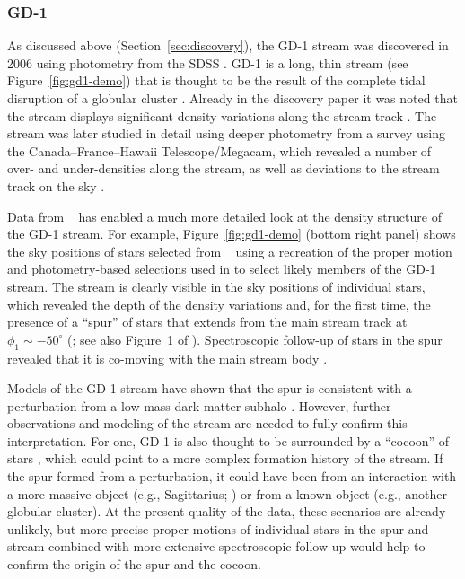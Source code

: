 \documentclass[final,5p,times,twocolumn,authoryear]{elsarticle}
\begin{document}
\subsubsection{GD-1}
\label{sec:gd1}

As discussed above (Section~\ref{sec:discovery}), the GD-1 stream was discovered in 2006
using photometry from the SDSS \citep{grillmair:2006-gd1}.
GD-1 is a long, thin stream (see Figure~\ref{fig:gd1-demo}) that is thought to be the
result of the complete tidal disruption of a globular cluster \citep{koposov:2010}.
Already in the discovery paper it was noted that the stream displays significant density
variations along the stream track \citep{grillmair:2006-gd1}.
The stream was later studied in detail using deeper photometry from a survey using the
Canada--France--Hawaii Telescope/Megacam, which revealed a number of over- and
under-densities along the stream, as well as deviations to the stream track
on the sky \citep{deboer:2018}.

Data from \gaia\  has enabled a much more detailed look at the density structure
of the GD-1 stream.
For example, Figure~\ref{fig:gd1-demo} (bottom right panel) shows the sky positions of
stars selected from \gaia\  using a recreation of the proper motion and
photometry-based selections used in \citep{price-whelan:2018} to select likely members
of the GD-1 stream.
The stream is clearly visible in the sky positions of individual stars, which revealed
the depth of the density variations and, for the first time, the presence of a ``spur''
of stars that extends from the main stream track at $\phi_1 \sim -50^\circ$
(\citealt{price-whelan:2018}; see also Figure~1 of \citealt{bonaca:2019b}).
Spectroscopic follow-up of stars in the spur revealed that it is co-moving with the main
stream body \citep{bonaca:2020b}.

Models of the GD-1 stream have shown that the spur is consistent with a perturbation
from a low-mass dark matter subhalo \citep{bonaca:2019, bonaca:2020b}.
However, further observations and modeling of the stream are needed to fully confirm
this interpretation.
For one, GD-1 is also thought to be surrounded by a ``cocoon'' of stars
\citep{malhan:2019a}, which could point to a more complex formation history of the
stream.
If the spur formed from a perturbation, it could have been from an interaction with a
more massive object (e.g., Sagittarius; \citealt{dillamore:2022}) or from a known object
(e.g., another globular cluster).
At the present quality of the data, these scenarios are already unlikely, but more
precise proper motions of individual stars in the spur and stream combined with more
extensive spectroscopic follow-up would help to confirm the origin of the spur and the
cocoon.
\end{document}
